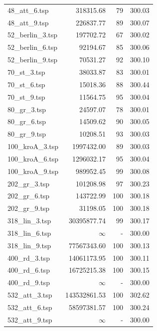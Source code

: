 \begin{table}[H]
\begin{tabular}{|l|r|r|r|}
48\_att\_6.tsp & 318315.68 & 79 & 300.03 \\
48\_att\_9.tsp & 226837.77 & 89 & 300.07 \\
52\_berlin\_3.tsp & 197702.72 & 67 & 300.02 \\
52\_berlin\_6.tsp & 92194.67 & 85 & 300.06 \\
52\_berlin\_9.tsp & 70531.27 & 92 & 300.10 \\
70\_st\_3.tsp & 38033.87 & 83 & 300.01 \\
70\_st\_6.tsp & 15018.36 & 88 & 300.44 \\
70\_st\_9.tsp & 11564.75 & 95 & 300.04 \\
80\_gr\_3.tsp & 24597.07 & 78 & 300.01 \\
80\_gr\_6.tsp & 14509.62 & 90 & 300.05 \\
80\_gr\_9.tsp & 10208.51 & 93 & 300.03 \\
100\_kroA\_3.tsp & 1997432.00 & 89 & 300.03 \\
100\_kroA\_6.tsp & 1296032.17 & 95 & 300.04 \\
100\_kroA\_9.tsp & 989952.45 & 99 & 300.08 \\
202\_gr\_3.tsp & 101208.98 & 97 & 300.23 \\
202\_gr\_6.tsp & 143722.99 & 100 & 300.18 \\
202\_gr\_9.tsp & 31198.05 & 100 & 300.18 \\
318\_lin\_3.tsp & 30395877.74 & 99 & 300.17 \\
318\_lin\_6.tsp & $\infty$ & - & 300.00 \\
318\_lin\_9.tsp & 77567343.60 & 100 & 300.13 \\
400\_rd\_3.tsp & 14061173.95 & 100 & 300.11 \\
400\_rd\_6.tsp & 16725215.38 & 100 & 300.15 \\
400\_rd\_9.tsp & $\infty$ & - & 300.00 \\
532\_att\_3.tsp & 143532861.53 & 100 & 302.62 \\
532\_att\_6.tsp & 58597381.57 & 100 & 300.24 \\
532\_att\_9.tsp & $\infty$ & - & 300.00 \\
\hline
\end{tabular}
\end{table}
